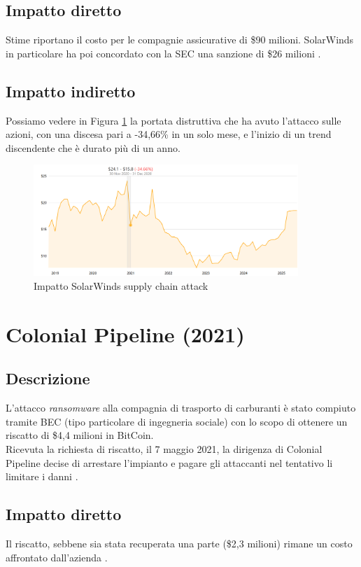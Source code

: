 \documentclass[12pt,a4paper,twoside]{report}
\begin{document}
\subsection{Impatto diretto}
Stime riportano il costo per le compagnie assicurative di \$90 milioni. SolarWinds in particolare ha poi concordato con la SEC una sanzione di \$26 milioni \cite{SolarWinds_2022_SEC}. 
\subsection{Impatto indiretto}
Possiamo vedere in Figura \ref{fig:slrw} \cite{compMarketCap_solarwinds} la portata distruttiva che ha avuto l'attacco sulle azioni, con una discesa pari a -34,66\% in un solo mese, e l'inizio di un trend discendente che \`e durato pi\`u di un anno.\\
\begin{figure}[H] 
\begin{center} 
\includegraphics[width=10cm]{figures/solarwinds.png} 
\caption[Grafico SolarWinds]{Impatto SolarWinds supply chain attack}\label{fig:slrw}
\end{center}
\end{figure}

\section{Colonial Pipeline (2021)}
\subsection{Descrizione}
L'attacco \textit{ransomware} alla compagnia di trasporto di carburanti \`e stato compiuto tramite BEC (tipo particolare di ingegneria sociale) con lo scopo di ottenere un riscatto di \$4,4 milioni in BitCoin.\\
Ricevuta la richiesta di riscatto, il 7 maggio 2021, la dirigenza di Colonial Pipeline decise di arrestare l'impianto e pagare gli attaccanti nel tentativo li limitare i danni \cite{ColonialPipe_IEEE}.
\subsection{Impatto diretto}
Il riscatto, sebbene sia stata recuperata una parte (\$2,3 milioni) rimane un costo affrontato dall'azienda \cite{ColonialPipe_IEEE}.\\
\end{document}
